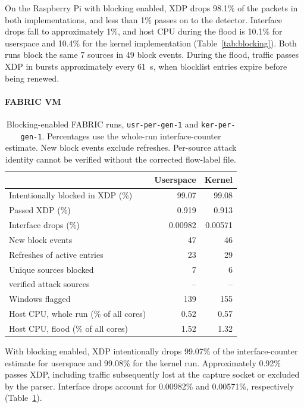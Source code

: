On the Raspberry Pi with blocking enabled, XDP drops 98.1\% of the packets in both
implementations, and less than 1\% passes on to the detector. Interface
drops fall to approximately 1\%, and host CPU during the flood is 10.1\%
for userspace and 10.4\% for the kernel implementation
(Table~\ref{tab:blocking}). Both runs block the same 7 sources in 49 block
events. During the flood, traffic passes XDP in bursts approximately every
61~s, when blocklist entries expire before being renewed.

\paragraph{FABRIC VM}

\begin{table}[H]
  \centering
  \small
  \begin{tabular}{@{}lrr@{}}
    \toprule
    & Userspace & Kernel \\
    \midrule
    Intentionally blocked in XDP (\%) & 99.07 & 99.08 \\
    Passed XDP (\%) & 0.919 & 0.913 \\
    Interface drops (\%) & 0.00982 & 0.00571 \\
    New block events & 47 & 46 \\
    Refreshes of active entries & 23 & 29 \\
    Unique sources blocked & 7 & 6 \\
    \quad verified attack sources & -- & -- \\
    Windows flagged & 139 & 155 \\
    Host CPU, whole run (\% of all cores) & 0.52 & 0.57 \\
    Host CPU, flood (\% of all cores) & 1.52 & 1.32 \\
    \bottomrule
  \end{tabular}
  \caption{Blocking-enabled FABRIC runs, \texttt{usr-per-gen-1} and \texttt{ker-per-gen-1}. Percentages use the whole-run interface-counter estimate. New block events exclude refreshes. Per-source attack identity cannot be verified without the corrected flow-label file.}
  \label{tab:fabric-blocking}
\end{table}

With blocking enabled, XDP intentionally drops 99.07\% of the interface-counter
estimate for userspace and 99.08\% for the kernel run. Approximately 0.92\%
passes XDP, including traffic subsequently lost at the capture socket or
excluded by the parser. Interface drops account for 0.00982\% and 0.00571\%,
respectively (Table~\ref{tab:fabric-blocking}).

